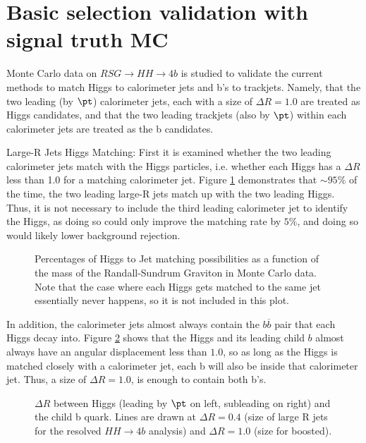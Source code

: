 \section{Basic selection validation with signal truth MC}
\label{app:signal-mcstudy}

Monte Carlo data on $RSG \to HH \to 4b$ is studied to validate the current methods to match Higgs to calorimeter jets and b's to trackjets. Namely, that the two leading (by $\pt$) calorimeter jets, each with a size of $\Delta R = 1.0$ are treated as Higgs candidates, and that the two leading trackjets (also by $\pt$) within each calorimeter jets are treated as the b candidates.

Large-R Jets Higgs Matching: First it is examined whether the two leading calorimeter jets match with the Higgs particles, i.e. whether each Higgs has a $\Delta R$ less than 1.0 for a matching calorimeter jet. Figure \ref{fig:app-truth-Higgs} demonstrates that $\sim 95\%$ of the time, the two leading large-R jets match up with the two leading Higgs. Thus, it is not necessary to include the third leading calorimeter jet to identify the Higgs, as doing so could only improve the matching rate by $5\%$, and doing so would likely lower background rejection.

\begin{figure}[htbp!]
\begin{center}
\caption{Percentages of Higgs to Jet matching possibilities as a function of the mass of the Randall-Sundrum Graviton in Monte Carlo data. Note that the case where each Higgs gets matched to the same jet essentially never happens, so it is not included in this plot.}
\label{fig:app-truth-Higgs}
\end{center}
\end{figure}

In addition, the calorimeter jets almost always contain the $b\overline{b}$ pair that each Higgs decay into. Figure \ref{fig:app-truth-HbdR} shows that the Higgs and its leading child $b$ almost always have an angular displacement less than $1.0$, so as long as the Higgs is matched closely with a calorimeter jet, each b will also be inside that calorimeter jet. Thus, a size of $\Delta R = 1.0$, is enough to contain both b's.

\begin{figure}[htbp!]
\begin{center}
\qquad
\caption{$\Delta R$ between Higgs (leading by $\pt$ on left, subleading on right) and the child b quark. Lines are drawn at $\Delta R = 0.4$ (size of large R jets for the resolved $HH \to 4b$ analysis) and $\Delta R = 1.0$ (size for boosted). }
\label{fig:app-truth-HbdR}
\end{center}
\end{figure}


